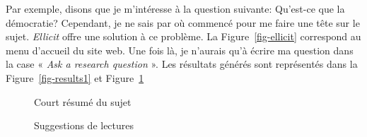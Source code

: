 \documentclass[
  letterpaper,
]{scrbook}
\begin{document}
Par exemple, disons que je m'intéresse à la question suivante: Qu'est-ce
que la démocratie? Cependant, je ne sais par où commencé pour me faire
une tête sur le sujet. \emph{Ellicit} offre une solution à ce problème.
La Figure~\ref{fig-ellicit} correspond au menu d'accueil du site web.
Une fois là, je n'aurais qu'à écrire ma question dans la case «
\emph{Ask a research question} ». Les résultats générés sont représentés
dans la Figure~\ref{fig-results1} et Figure~\ref{fig-results2}

\begin{figure}

\begin{minipage}[t]{0.50\linewidth}

{\centering 


\caption{\label{fig-results1}Court résumé du sujet}

}

\end{minipage}%
%
\begin{minipage}[t]{0.50\linewidth}

{\centering 


\caption{\label{fig-results2}Suggestions de lectures}

}

\end{minipage}%

\end{figure}
\end{document}
